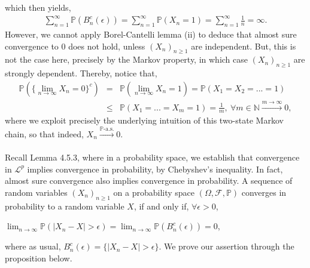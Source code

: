 \documentclass{article}
\begin{document}
which then yields,
\begin{eqnarray}
\nonumber
\sum_{n=1}^{\infty}\mathbb{P}(B_n^c(\epsilon)) = \sum_{n=1}^{\infty}\mathbb{P}(X_n = 1) = \sum_{n=1}^{\infty}\frac{1}{n} = \infty.
\end{eqnarray}
However, we cannot apply Borel-Cantelli lemma (ii) to deduce that almost sure convergence to $0$ does not hold, unless $(X_n)_{n\geq1}$ are independent. But, this is not the case here, precisely by the Markov property, in which case $(X_n)_{n\geq1}$ are strongly dependent. Thereby, notice that,
\begin{eqnarray}
\nonumber
\mathbb{P}(\{\lim_{n\to\infty}X_n = 0\}^c) &=& \mathbb{P}(\lim_{n\to\infty}X_n = 1) = \mathbb{P}(X_1 = X_2 = ... = 1)\\
\nonumber
&\leq& \mathbb{P}(X_1 = ... = X_m = 1) = \frac{1}{m}, \ \forall m \in \mathbb{N} \xrightarrow{m\to\infty} 0,
\end{eqnarray}
where we exploit precisely the underlying intuition of this two-state Markov chain, so that indeed, $X_n \xrightarrow{\mathbb{P}\text{-a.s.}} 0$. \\\\
Recall Lemma 4.5.3, where in a probability space, we establish that convergence in $\mathcal{L}^p$ implies convergence in probability, by Chebyshev's inequality. In fact, almost sure convergence also implies convergence in probability. A sequence of random variables $(X_n)_{n\geq1}$ on a probability space $(\Omega,\mathcal{F},\mathbb{P})$ converges in probability to a random variable $X$, if and only if, $\forall \epsilon > 0$,
\begin{center}
	$\lim_{n\to\infty}\mathbb{P}(|X_n - X| > \epsilon) = \lim_{n\to\infty}\mathbb{P}(B_n^c(\epsilon)) = 0$,
\end{center}
where as usual, $B_n^c(\epsilon) = \{|X_n - X| > \epsilon\}$. We prove our assertion through the proposition below.\\\\
\noindent{}\\\\\\
\end{document}
